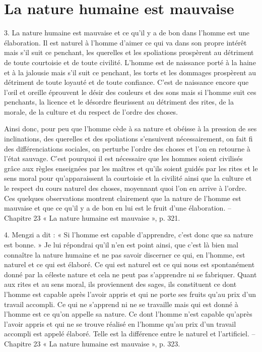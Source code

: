\section{La nature humaine est mauvaise
}

3.	La nature humaine est mauvaise et ce qu’il y a de bon dans l’homme est une élaboration. Il est naturel à l’homme d’aimer ce qui va dans son propre intérêt mais s’il suit ce penchant,
les querelles et les spoliations prospèrent au détriment de toute courtoisie et de toute civilité. L’homme est de naissance porté à la haine et à la jalousie mais s’il suit ce penchant, les torts et les dommages prospèrent au détriment de toute loyauté et de toute confiance. C’est de naissance encore que l’œil et oreille éprouvent le désir des couleurs et des sons mais si l’homme suit ces penchants, la licence et le désordre fleurissent au détriment des rites, de la morale, de la culture et du respect de l’ordre des choses.
 
Ainsi donc, pour peu que l’homme cède à sa nature et obéisse à la pression de ses inclinations, des querelles et des spoliations s’ensuivent nécessairement, on fait fi des différenciations sociales, on perturbe l’ordre des choses et l’on en retourne à l’état sauvage. C’est pourquoi il est nécessaire que les hommes soient civilisés grâce aux règles enseignées par les maîtres et qu’ils soient guidés par les rites et le sens moral pour qu’apparaissent la courtoisie et la civilité ainsi que la culture et le respect du cours naturel des choses, moyennant quoi l’on en arrive à l’ordre. Ces quelques observations montrent clairement que la nature de l’homme est mauvaise et que ce qu’il y a de bon en lui est le fruit d’une élaboration.
-- Chapitre 23 « La nature humaine est mauvaise », p. 321.

4.	Mengzi a dit : « Si l’homme est capable d’apprendre, c’est donc que sa nature est bonne. » Je lui répondrai qu’il n’en est point ainsi, que c’est là bien mal connaître la nature humaine et ne pas savoir discerner ce qui, en l’homme, est naturel et ce qui est élaboré.
Ce qui est naturel est ce qui nous est spontanément donné par la céleste nature et cela ne peut pas s’apprendre ni se fabriquer. Quant aux rites et au sens moral, ils proviennent des sages, ils constituent ce dont l’homme est capable après l’avoir appris et qui ne porte ses fruits qu’au prix d’un travail accompli. Ce qui ne s’apprend ni ne se travaille mais qui est donné à l’homme est ce qu’on appelle sa nature. Ce dont l’homme n’est capable qu’après l’avoir appris et qui ne se trouve réalisé en l’homme qu’au prix d’un travail accompli est appelé élaboré. Telle est la différence entre le naturel et l’artificiel.
-- Chapitre 23 « La nature humaine est mauvaise », p. 323.

